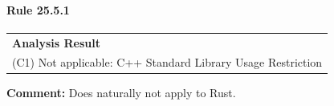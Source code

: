 \paragraph{Rule 25.5.1}
\begin{longtable}{p{13cm}}
\textbf{Analysis Result} \\
(C1) Not applicable: C++ Standard Library Usage Restriction \\
\end{longtable}
\textbf{Comment:} Does naturally not apply to Rust. \\
